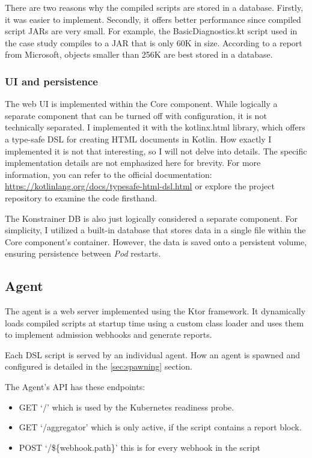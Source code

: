 There are two reasons why the compiled scripts are stored in a database. Firstly, it was easier to implement. Secondly, it offers better performance since compiled script JARs are very small. For example, the BasicDiagnostics.kt script used in the case study compiles to a JAR that is only 60K in size. According to a\cite{DbSmall} report from Microsoft, objects smaller than 256K are best stored in a database.

\subsubsection{UI and persistence}

The web UI is implemented within the Core component. While logically a separate component that can be turned off with configuration, it is not technically separated. I implemented it with the kotlinx.html library, which offers a type-safe DSL for creating HTML documents in Kotlin. How exactly I implemented it is not that interesting, so I will not delve into details. The specific implementation details are not emphasized here for brevity. For more information, you can refer to the official documentation: \url{https://kotlinlang.org/docs/typesafe-html-dsl.html} or explore the project repository to examine the code firsthand.

The Konstrainer DB is also just logically considered a separate component. For simplicity, I utilized a built-in database that stores data in a single file within the Core component's container. However, the data is saved onto a persistent volume, ensuring persistence between \emph{Pod} restarts.

\subsection{Agent}

The agent is a web server implemented using the Ktor framework. It dynamically loads compiled scripts at startup time using a custom class loader and uses them to implement admission webhooks and generate reports.

Each DSL script is served by an individual agent. How an agent is spawned and configured is detailed in the \ref{sec:spawning} section.

The Agent's API has these endpoints:

\begin{itemize}
    \item GET `/' which is used by the Kubernetes readiness probe.
    \item GET `/aggregator' which is only active, if the script contains a report block.
    \item POST `/\$\{webhook.path\}' this is for every webhook in the script
\end{itemize}

